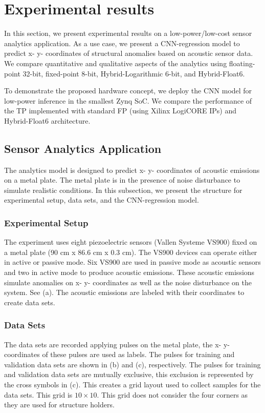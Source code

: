 \section{Experimental results}
\label{sec:experimental_results}
In this section, we present experimental results on a low-power/low-cost sensor analytics application. As a use case, we present a CNN-regression model to predict x- y- coordinates of structural anomalies based on acoustic sensor data. We compare quantitative and qualitative aspects of the analytics using floating-point 32-bit, fixed-point 8-bit, Hybrid-Logarithmic 6-bit, and Hybrid-Float6.

To demonstrate the proposed hardware concept, we deploy the CNN model for low-power inference in the smallest Zynq SoC. We compare the performance of the TP implemented with standard FP (using Xilinx LogiCORE IPs) and Hybrid-Float6 architecture.

\subsection{Sensor Analytics Application}
The analytics model is designed to predict x- y- coordinates of acoustic emissions on a metal plate. The metal plate is in the presence of noise disturbance to simulate realistic conditions. In this subsection, we present the structure for experimental setup, data sets, and the CNN-regression model.

\subsubsection{Experimental Setup}
The experiment uses eight piezoelectric sensors (Vallen Systeme VS900) fixed on a metal plate (90 cm x 86.6 cm x 0.3 cm). The VS900 devices can operate either in active or passive mode. Six VS900 are used in passive mode as acoustic sensors and two in active mode to produce acoustic emissions. These acoustic emissions simulate anomalies on x- y- coordinates as well as the noise disturbance on the system. See (a). The acoustic emissions are labeled with their coordinates to create data sets.

\subsubsection{Data Sets}
The data sets are recorded applying pulses on the metal plate, the x- y- coordinates of these pulses are used as labels. The pulses for training and validation data sets are shown in (b) and (c), respectively. The pulses for training and validation data sets are mutually exclusive, this exclusion is represented by the cross symbols in (c). This creates a grid layout used to collect samples for the data sets. This grid is $10\times10$. This grid does not consider the four corners as they are used for structure holders.

